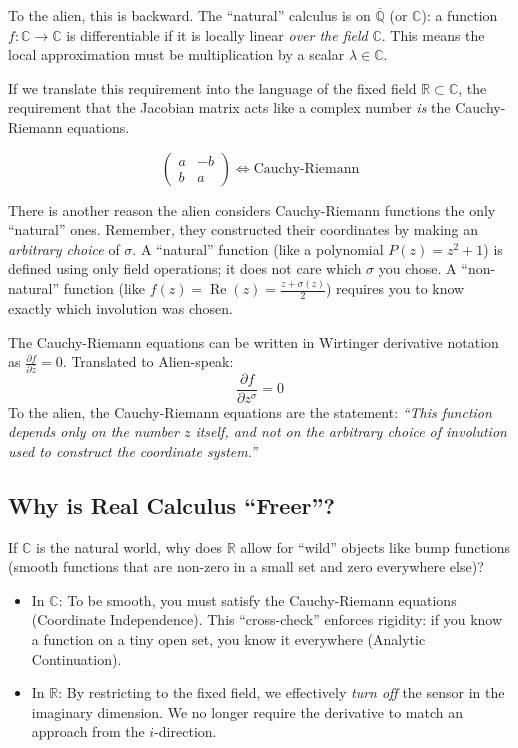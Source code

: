\documentclass{article}
\newcommand{\C}{{\mathbb{C}}}
\newcommand{\Q}{{\mathbb{Q}}}
\newcommand{\R}{{\mathbb{R}}}
\renewcommand{\Re}{{\operatorname{Re}}}
\newcommand{\oln}[1]{{\overline{#1}}}
\begin{document}
To the alien, this is backward. The ``natural'' calculus is on $\oln{\Q}$ (or $\C$): a function $f: \C \to \C$
is differentiable if it is locally linear \emph{over the field} $\C$. This means the local approximation must
be multiplication by a scalar $\lambda \in \C$.

If we translate this requirement into the language of the fixed field $\R \subset \C$, the requirement that the Jacobian matrix acts like a complex number \emph{is} the Cauchy-Riemann equations.

\[
\begin{pmatrix} a & -b \\ b & a \end{pmatrix} \iff \text{Cauchy-Riemann}
\]

There is another reason the alien considers Cauchy-Riemann functions the only ``natural'' ones. Remember, they
constructed their coordinates by making an \emph{arbitrary choice} of $\sigma$. A ``natural'' function (like a
polynomial $P(z) = z^2+1$) is defined using only field operations; it does not care which $\sigma$ you chose.
A ``non-natural'' function (like $f(z) = \Re(z) = \frac{z+\sigma(z)}{2}$) requires you to know exactly which
involution was chosen.

The Cauchy-Riemann equations can be written in Wirtinger derivative notation as $\frac{\partial f}{\partial \bar{z}} = 0$. Translated to Alien-speak:
\[ \frac{\partial f}{\partial z^\sigma} = 0 \]
To the alien, the Cauchy-Riemann equations are the statement: \emph{``This function depends only on the number $z$ itself, and not on the arbitrary choice of involution used to construct the coordinate system.''}

\subsection{Why is Real Calculus ``Freer''?}
If $\C$ is the natural world, why does $\R$ allow for ``wild'' objects like bump functions (smooth functions that are non-zero in a small set and zero everywhere else)?

\begin{itemize}
    \item In $\C$: To be smooth, you must satisfy the Cauchy-Riemann equations (Coordinate Independence). This ``cross-check'' enforces rigidity: if you know a function on a tiny open set, you know it everywhere (Analytic Continuation).
    \item In $\R$: By restricting to the fixed field, we effectively \emph{turn off} the sensor in the imaginary dimension. We no longer require the derivative to match an approach from the $i$-direction.
\end{itemize}
\end{document}
